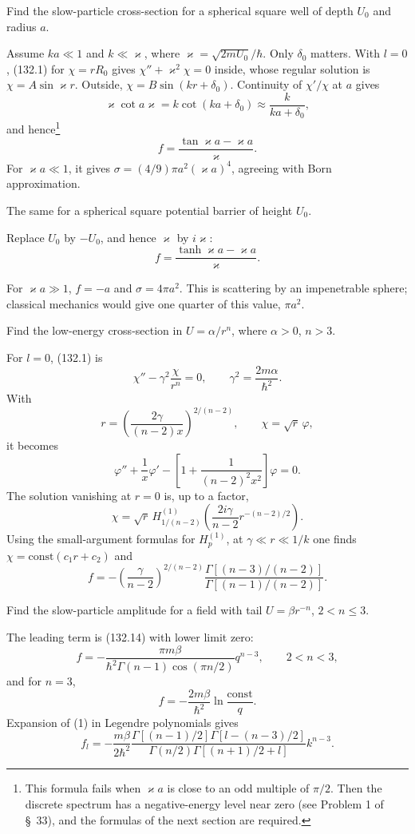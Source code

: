  Find the slow-particle cross-section for a spherical square
well of depth $U_0$ and radius $a$.

\SolutionHeading Assume $ka\ll1$ and $k\ll\varkappa$, where
$\varkappa=\sqrt{2mU_0}/\hbar$. Only $\delta_0$ matters. With $l=0$, (132.1)
for $\chi=rR_0$ gives $\chi''+\varkappa^2\chi=0$ inside, whose regular solution
is $\chi=A\sin\varkappa r$. Outside,
$\chi=B\sin(kr+\delta_0)$. Continuity of $\chi'/\chi$ at $a$ gives
\[
 \varkappa\cot a\varkappa=k\cot(ka+\delta_0)
 \approx\frac{k}{ka+\delta_0},
\]
and hence\footnote{This formula fails when $\varkappa a$ is close to an odd
multiple of $\pi/2$. Then the discrete spectrum has a negative-energy level
near zero (see Problem 1 of \S~33), and the formulas of the next section are
required.}
\[
 f=\frac{\tan\varkappa a-\varkappa a}{\varkappa}.
\]
For $\varkappa a\ll1$, it gives
$\sigma=(4/9)\pi a^2(\varkappa a)^4$, agreeing with Born approximation.

 The same for a spherical square potential barrier of
height $U_0$.

\SolutionHeading Replace $U_0$ by $-U_0$, and hence $\varkappa$ by
$i\varkappa$:
\[
 f=\frac{\tanh\varkappa a-\varkappa a}{\varkappa}.
\]

For $\varkappa a\gg1$, $f=-a$ and $\sigma=4\pi a^2$. This is scattering by an
impenetrable sphere; classical mechanics would give one quarter of this value,
$\pi a^2$.

 Find the low-energy cross-section in
$U=\alpha/r^n$, where $\alpha>0$, $n>3$.

\SolutionHeading For $l=0$, (132.1) is
\[
 \chi''-\gamma^2\frac{\chi}{r^n}=0,\qquad
 \gamma^2=\frac{2m\alpha}{\hbar^2}.
\]
With
\[
 r=\left(\frac{2\gamma}{(n-2)x}\right)^{2/(n-2)},\qquad
 \chi=\sqrt r\,\varphi,
\]
it becomes
\[
 \varphi''+\frac1x\varphi'-\left[1+\frac1{(n-2)^2x^2}\right]\varphi=0.
\]
The solution vanishing at $r=0$ is, up to a factor,
\[
 \chi=\sqrt r\,H_{1/(n-2)}^{(1)}
 \left(\frac{2i\gamma}{n-2}r^{-(n-2)/2}\right).
\]
Using the small-argument formulas for $H_p^{(1)}$, at
$\gamma\ll r\ll1/k$ one finds $\chi=\mathrm{const}(c_1r+c_2)$ and
\[
 f=-\left(\frac{\gamma}{n-2}\right)^{2/(n-2)}
 \frac{\Gamma[(n-3)/(n-2)]}{\Gamma[(n-1)/(n-2)]}.
\]

 Find the slow-particle amplitude for a field with tail
$U=\beta r^{-n}$, $2<n\leq3$.

\SolutionHeading The leading term is (132.14) with lower limit zero:
\begin{equation}
 f=-\frac{\pi m\beta}{\hbar^2\Gamma(n-1)\cos(\pi n/2)}q^{n-3},
 \qquad2<n<3, \tag{1}
\end{equation}
and for $n=3$,
\begin{equation}
 f=-\frac{2m\beta}{\hbar^2}\ln\frac{\mathrm{const}}q. \tag{2}
\end{equation}
Expansion of (1) in Legendre polynomials gives
\begin{equation}
 f_l=-\frac{m\beta}{2\hbar^2}
 \frac{\Gamma[(n-1)/2]\Gamma[l-(n-3)/2]}
 {\Gamma(n/2)\Gamma[(n+1)/2+l]}k^{n-3}. \tag{3}
\end{equation}

